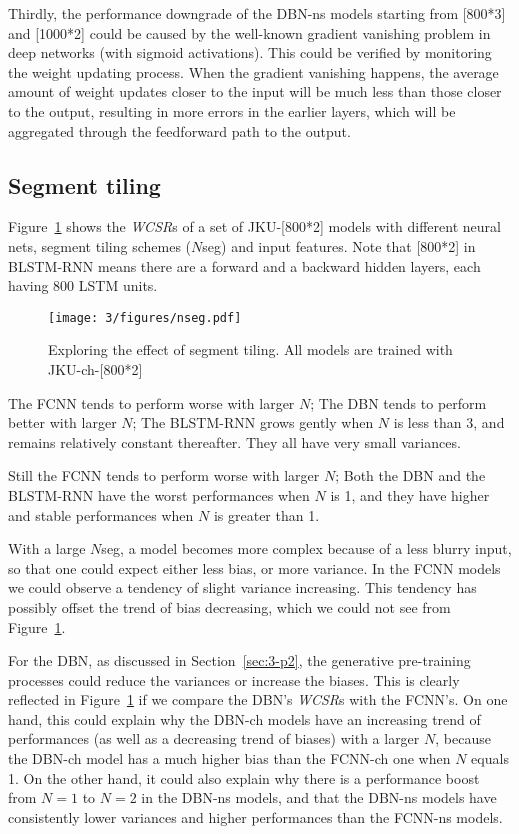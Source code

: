 Thirdly, the performance downgrade of the DBN-ns models starting from [800*3] and [1000*2] could be caused by the well-known gradient vanishing problem in deep networks (with sigmoid activations). This could be verified by monitoring the weight updating process. When the gradient vanishing happens, the average amount of weight updates closer to the input will be much less than those closer to the output, resulting in more errors in the earlier layers, which will be aggregated through the feedforward path to the output.

\subsection{Segment tiling} \label{sec:3-p3}

Figure~\ref{fig:3-nseg} shows the \textit{WCSR}s of a set of JKU-[800*2] models with different neural nets, segment tiling schemes ($N$seg) and input features. Note that [800*2] in BLSTM-RNN means there are a forward and a backward hidden layers, each having 800 LSTM units.
\begin{figure}[h!]
	\centering
	\texttt{[image: 3/figures/nseg.pdf]}
	\caption{Exploring the effect of segment tiling. All models are trained with JKU-ch-[800*2]}
	\label{fig:3-nseg}
\end{figure}

The FCNN tends to perform worse with larger $N$; The DBN tends to perform better with larger $N$; The BLSTM-RNN grows gently when $N$ is less than 3, and remains relatively constant thereafter. They all have very small variances.

Still the FCNN tends to perform worse with larger $N$; Both the DBN and the BLSTM-RNN have the worst performances when $N$ is 1, and they have higher and stable performances when $N$ is greater than 1.

With a large $N$seg, a model becomes more complex because of a less blurry input, so that one could expect either less bias, or more variance. In the FCNN models we could observe a tendency of slight variance increasing. This tendency has possibly offset the trend of bias decreasing, which we could not see from Figure~\ref{fig:3-nseg}.

For the DBN, as discussed in Section~\ref{sec:3-p2}, the generative pre-training processes could reduce the variances or increase the biases. This is clearly reflected in Figure~\ref{fig:3-nseg} if we compare the DBN's \textit{WCSR}s with the FCNN's. On one hand, this could explain why the DBN-ch models have an increasing trend of performances (as well as a decreasing trend of biases) with a larger $N$, because the DBN-ch model has a much higher bias than the FCNN-ch one when $N$ equals 1. On the other hand, it could also explain why there is a performance boost from $N=1$ to $N=2$ in the DBN-ns models, and that the DBN-ns models have consistently lower variances and higher performances than the FCNN-ns models.

